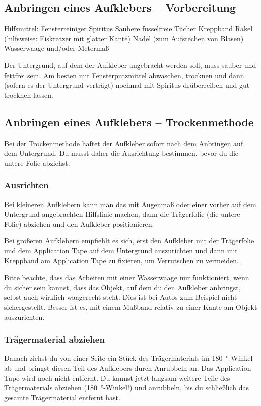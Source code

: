 \documentclass{\basedir/fablab-document}
\begin{document}
\subsection{Anbringen eines Aufklebers -- Vorbereitung}
Hilfsmittel:
\textbullet Fensterreiniger
\textbullet Spiritus
\textbullet Saubere fusselfreie Tücher
\textbullet Kreppband
\textbullet Rakel (hilfsweise: Eiskratzer mit glatter Kante)
\textbullet Nadel (zum Aufstechen von Blasen)
\textbullet Wasserwaage und/oder Metermaß

Der Untergrund, auf dem der Aufkleber angebracht werden soll, muss sauber und fettfrei sein.
Am besten mit Fensterputzmittel abwaschen, trocknen und dann (sofern es der Untergrund verträgt) nochmal mit Spiritus drüberreiben und gut trocknen lassen.

\subsection{Anbringen eines Aufklebers -- Trockenmethode}
Bei der Trockenmethode haftet der Aufkleber sofort nach dem Anbringen auf dem Untergrund.
Du musst daher die Ausrichtung bestimmen, bevor du die untere Folie abziehst.

\subsubsection{Ausrichten}
Bei kleineren Aufklebern kann man das mit Augenmaß oder einer vorher auf dem Untergrund angebrachten Hilfslinie machen, dann die Trägerfolie (die untere Folie) abziehen und den Aufkleber positionieren. 

Bei größeren Aufklebern empfiehlt es sich, erst den Aufkleber mit der Trägerfolie und dem Application Tape auf dem Untergrund auszurichten und dann mit Kreppband am Application Tape zu fixieren, um Verrutschen zu vermeiden.

Bitte beachte, dass das Arbeiten mit einer Wasserwaage nur funktioniert, wenn du sicher sein kannst, dass das Objekt, auf dem du den Aufkleber anbringst, selbst auch wirklich waagerecht steht.
Dies ist bei Autos zum Beispiel nicht sichergestellt.
Besser ist es, mit einem Maßband relativ zu einer Kante am Objekt auszurichten.

\subsubsection{Trägermaterial abziehen}
Danach ziehst du von einer Seite ein Stück des Trägermaterials im \SI{180}{\degree}-Winkel ab und bringst diesen Teil des Aufklebers durch Anrubbeln an.
Das Application Tape wird noch nicht entfernt.
Du kannst jetzt langsam weitere Teile des Trägermaterials abziehen (\SI{180}{\degree}-Winkel!) und anrubbeln,
bis du schließlich das gesamte Trägermaterial entfernt hast.
\end{document}
